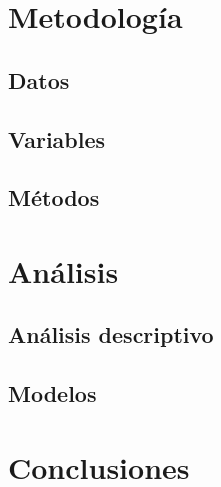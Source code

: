 \documentclass[12pt,twoside]{templates/facsothesis}
\begin{document}
\hypertarget{metodologuxeda}{%
\chapter{Metodología}\label{metodologuxeda}}

\hypertarget{datos}{%
\section{Datos}\label{datos}}

\hypertarget{variables}{%
\section{Variables}\label{variables}}

\hypertarget{muxe9todos}{%
\section{Métodos}\label{muxe9todos}}

\hypertarget{anuxe1lisis}{%
\chapter{Análisis}\label{anuxe1lisis}}

\hypertarget{anuxe1lisis-descriptivo}{%
\section{Análisis descriptivo}\label{anuxe1lisis-descriptivo}}

\hypertarget{modelos}{%
\section{Modelos}\label{modelos}}

\hypertarget{conclusiones}{%
\chapter{Conclusiones}\label{conclusiones}}



\end{document}
